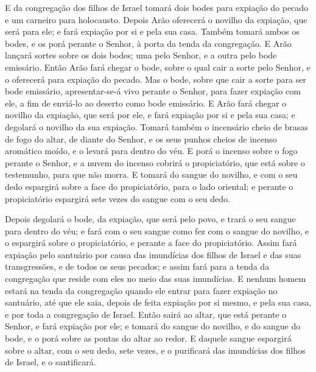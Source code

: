 E da congregação dos filhos de Israel tomará dois bodes para
expiação do pecado e um carneiro para holocausto. Depois Arão
oferecerá o novilho da expiação, que será para ele; e fará expiação
por si e pela sua casa. Também tomará ambos os bodes, e os porá
perante o Senhor, à porta da tenda da congregação. E Arão
lançará sortes sobre os dois bodes; uma pelo Senhor, e a outra pelo
bode emissário. Então Arão fará chegar o bode, sobre o qual cair
a sorte pelo Senhor, e o oferecerá para expiação do pecado.
Mas o bode, sobre que cair a sorte para ser bode emissário,
apresentar-se-á vivo perante o Senhor, para fazer expiação com ele,
a fim de enviá-lo ao deserto como bode emissário. E Arão fará
chegar o novilho da expiação, que será por ele, e fará expiação por
si e pela sua casa; e degolará o novilho da sua expiação.
Tomará também o incensário cheio de brasas de fogo do altar,
de diante do Senhor, e os seus punhos cheios de incenso aromático
moído, e o levará para dentro do véu. E porá o incenso sobre
o fogo perante o Senhor, e a nuvem do incenso cobrirá o
propiciatório, que está sobre o testemunho, para que não morra.
E tomará do sangue do novilho, e com o seu dedo espargirá
sobre a face do propiciatório, para o lado oriental; e perante o
propiciatório espargirá sete vezes do sangue com o seu dedo.

Depois degolará o bode, da expiação, que será pelo povo, e trará
o seu sangue para dentro do véu; e fará com o seu sangue como fez
com o sangue do novilho, e o espargirá sobre o propiciatório, e
perante a face do propiciatório. Assim fará expiação pelo
santuário por causa das imundícias dos filhos de Israel e das suas
transgressões, e de todos os seus pecados; e assim fará para a tenda
da congregação que reside com eles no meio das suas imundícias.
E nenhum homem estará na tenda da congregação quando ele
entrar para fazer expiação no santuário, até que ele saia, depois de
feita expiação por si mesmo, e pela sua casa, e por toda a
congregação de Israel. Então sairá ao altar, que está perante
o Senhor, e fará expiação por ele; e tomará do sangue do novilho, e
do sangue do bode, e o porá sobre as pontas do altar ao redor.
E daquele sangue espargirá sobre o altar, com o seu dedo,
sete vezes, e o purificará das imundícias dos filhos de Israel, e o
santificará.

